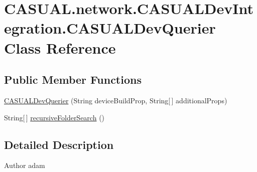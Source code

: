 \hypertarget{classCASUAL_1_1network_1_1CASUALDevIntegration_1_1CASUALDevQuerier}{\section{C\-A\-S\-U\-A\-L.\-network.\-C\-A\-S\-U\-A\-L\-Dev\-Integration.\-C\-A\-S\-U\-A\-L\-Dev\-Querier Class Reference}
\label{classCASUAL_1_1network_1_1CASUALDevIntegration_1_1CASUALDevQuerier}
}
\subsection*{Public Member Functions}
\begin{DoxyCompactItemize}
\item 
\hyperlink{classCASUAL_1_1network_1_1CASUALDevIntegration_1_1CASUALDevQuerier_a851f08561077481b8e936ec4f2d08a23}{C\-A\-S\-U\-A\-L\-Dev\-Querier} (String device\-Build\-Prop, String\mbox{[}$\,$\mbox{]} additional\-Props)
\item 
String\mbox{[}$\,$\mbox{]} \hyperlink{classCASUAL_1_1network_1_1CASUALDevIntegration_1_1CASUALDevQuerier_aee336d5bb7286f639b6951d2552106d1}{recursive\-Folder\-Search} ()
\end{DoxyCompactItemize}


\subsection{Detailed Description}
\begin{DoxyAuthor}{Author}
adam 
\end{DoxyAuthor}


